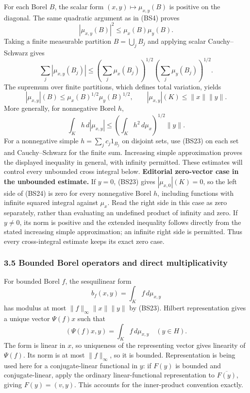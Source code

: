 \documentclass[
  11pt,
]{article}
\begin{document}
For each Borel \(B\), the scalar form \((x,y)\mapsto\mu_{x,y}(B)\) is
positive on the diagonal. The same quadratic argument as in (BS4) proves
\[
 |\mu_{x,y}(B)|^2\leq\mu_x(B)\mu_y(B).
 \tag{BS22}
\] Taking a finite measurable partition \(B=\bigcup_jB_j\) and applying
scalar Cauchy--Schwarz gives \[
 \sum_j|\mu_{x,y}(B_j)|
 \leq\left(\sum_j\mu_x(B_j)\right)^{1/2}
      \left(\sum_j\mu_y(B_j)\right)^{1/2}.
\] The supremum over finite partitions, which defines total variation,
yields \[
 |\mu_{x,y}|(B)\leq\mu_x(B)^{1/2}\mu_y(B)^{1/2},
 \qquad|\mu_{x,y}|(K)\leq\|x\|\|y\|.
 \tag{BS23}
\] More generally, for nonnegative Borel \(h\), \[
 \int_K h\,d|\mu_{x,y}|
 \leq\left(\int_Kh^2\,d\mu_x\right)^{1/2}\|y\|.
 \tag{BS24}
\] For a nonnegative simple \(h=\sum_jc_j1_{B_j}\) on disjoint sets, use
(BS23) on each set and Cauchy--Schwarz for the finite sum. Increasing
simple approximation proves the displayed inequality in general, with
infinity permitted. These estimates will control every unbounded cross
integral below. \textbf{Editorial zero-vector case in the unbounded
estimate.} If \(y=0\), (BS23) gives \(|\mu_{x,0}|(K)=0\), so the left
side of (BS24) is zero for every nonnegative Borel \(h\), including
functions with infinite squared integral against \(\mu_x\). Read the
right side in this case as zero separately, rather than evaluating an
undefined product of infinity and zero. If \(y\ne0\), its norm is
positive and the extended inequality follows directly from the stated
increasing simple approximation; an infinite right side is permitted.
Thus every cross-integral estimate keeps its exact zero case.

\subsubsection{3.5 Bounded Borel operators and direct
multiplicativity}\label{bounded-borel-operators-and-direct-multiplicativity}

For bounded Borel \(f\), the sesquilinear form \[
 b_f(x,y)=\int_K f\,d\mu_{x,y}
\] has modulus at most \(\|f\|_\infty\|x\|\|y\|\) by (BS23). Hilbert
representation gives a unique vector \(\Psi(f)x\) such that \[
 (\Psi(f)x,y)=\int_K f\,d\mu_{x,y}\quad(y\in H).
 \tag{BS25}
\] The form is linear in \(x\), so uniqueness of the representing vector
gives linearity of \(\Psi(f)\). Its norm is at most \(\|f\|_\infty\), so
it is bounded. Representation is being used here for a conjugate-linear
functional in \(y\): if \(F(y)\) is bounded and conjugate-linear, apply
the ordinary linear-functional representation to \(\overline{F(y)}\),
giving \(F(y)=(v,y)\). This accounts for the inner-product convention
exactly.
\end{document}
